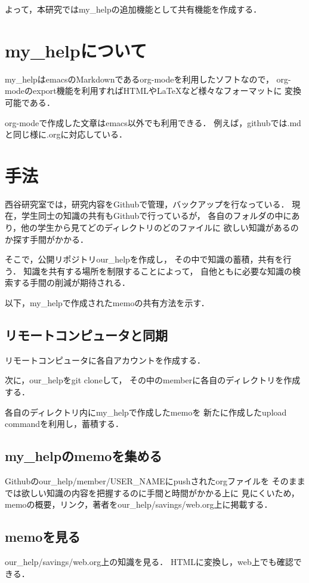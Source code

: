 \documentclass[a4j,twocolumn,uplatex]{jsarticle}
\begin{document}
よって，本研究ではmy\_helpの追加機能として共有機能を作成する．

\section{my\_helpについて}
my\_helpはemacsのMarkdownであるorg-modeを利用したソフトなので，
org-modeのexport機能を利用すればHTMLやLaTeXなど様々なフォーマットに
変換可能である\cite{org-mode}．

org-modeで作成した文章はemacs以外でも利用できる．
例えば，githubでは.mdと同じ様に.orgに対応している．

\section{手法}
西谷研究室では，研究内容をGithubで管理，バックアップを行なっている．
現在，学生同士の知識の共有もGithubで行っているが，
各自のフォルダの中にあり，他の学生から見てどのディレクトリのどのファイルに
欲しい知識があるのか探す手間がかかる．

そこで，公開リポジトリour\_helpを作成し，
その中で知識の蓄積，共有を行う．
知識を共有する場所を制限することによって，
自他ともに必要な知識の検索する手間の削減が期待される．

以下，my\_helpで作成されたmemoの共有方法を示す．
\subsection{リモートコンピュータと同期}
\label{sec-2-1}
リモートコンピュータに各自アカウントを作成する．

次に，our\_helpをgit cloneして，
その中のmemberに各自のディレクトリを作成する．

各自のディレクトリ内にmy\_helpで作成したmemoを
新たに作成したupload commandを利用し，蓄積する．

\subsection{my\_helpのmemoを集める}
\label{sec-2-2}
Githubのour\_help/member/USER\_NAMEにpushされたorgファイルを
そのままでは欲しい知識の内容を把握するのに手間と時間がかかる上に
見にくいため，
memoの概要，リンク，著者をour\_help/savings/web.org上に掲載する．


\subsection{memoを見る}
\label{sec-2-3}
our\_help/savings/web.org上の知識を見る．
HTMLに変換し，web上でも確認できる．
\end{document}
